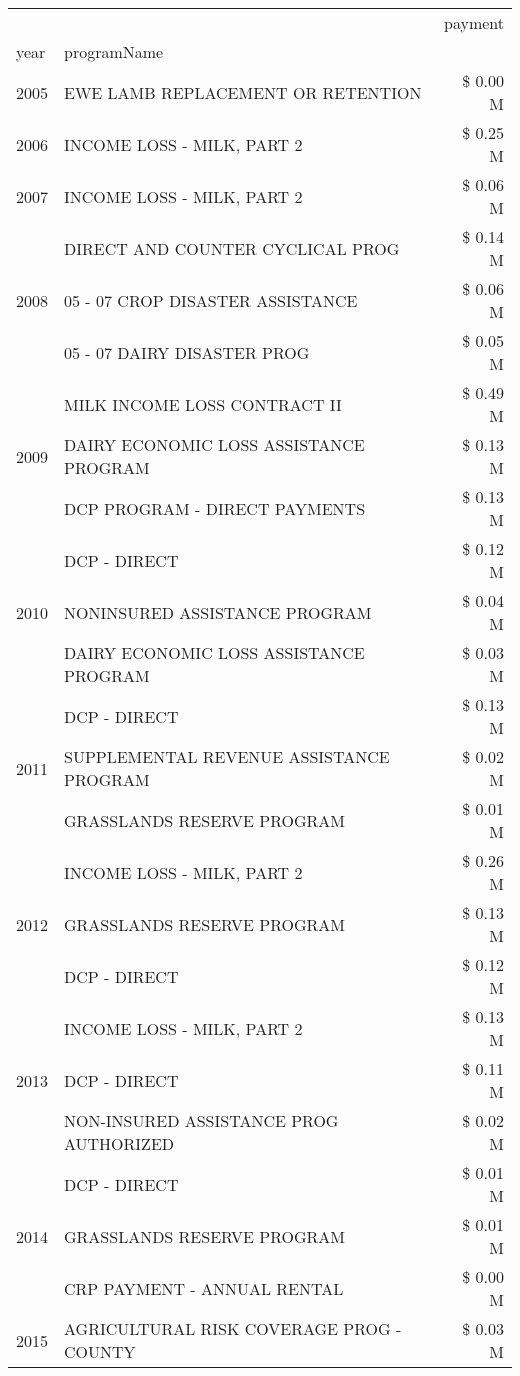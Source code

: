 \begin{tabular}{llr}
\toprule
 &  & payment \\
year & programName &  \\
\midrule
2005 & EWE LAMB REPLACEMENT OR RETENTION & \$ 0.00 M \\
\cline{1-3}
2006 & INCOME LOSS - MILK, PART 2 & \$ 0.25 M \\
\cline{1-3}
2007 & INCOME LOSS - MILK, PART 2 & \$ 0.06 M \\
\cline{1-3}
\multirow[t]{3}{*}{2008} & DIRECT AND COUNTER CYCLICAL PROG & \$ 0.14 M \\
 & 05 - 07 CROP DISASTER ASSISTANCE & \$ 0.06 M \\
 & 05 - 07 DAIRY DISASTER PROG & \$ 0.05 M \\
\cline{1-3}
\multirow[t]{3}{*}{2009} & MILK INCOME LOSS CONTRACT II & \$ 0.49 M \\
 & DAIRY ECONOMIC LOSS ASSISTANCE PROGRAM & \$ 0.13 M \\
 & DCP PROGRAM - DIRECT PAYMENTS & \$ 0.13 M \\
\cline{1-3}
\multirow[t]{3}{*}{2010} & DCP - DIRECT & \$ 0.12 M \\
 & NONINSURED ASSISTANCE PROGRAM & \$ 0.04 M \\
 & DAIRY ECONOMIC LOSS ASSISTANCE PROGRAM & \$ 0.03 M \\
\cline{1-3}
\multirow[t]{3}{*}{2011} & DCP - DIRECT & \$ 0.13 M \\
 & SUPPLEMENTAL REVENUE ASSISTANCE PROGRAM & \$ 0.02 M \\
 & GRASSLANDS RESERVE PROGRAM & \$ 0.01 M \\
\cline{1-3}
\multirow[t]{3}{*}{2012} & INCOME LOSS - MILK, PART 2 & \$ 0.26 M \\
 & GRASSLANDS RESERVE PROGRAM & \$ 0.13 M \\
 & DCP - DIRECT & \$ 0.12 M \\
\cline{1-3}
\multirow[t]{3}{*}{2013} & INCOME LOSS - MILK, PART 2 & \$ 0.13 M \\
 & DCP - DIRECT & \$ 0.11 M \\
 & NON-INSURED ASSISTANCE PROG AUTHORIZED & \$ 0.02 M \\
\cline{1-3}
\multirow[t]{3}{*}{2014} & DCP - DIRECT & \$ 0.01 M \\
 & GRASSLANDS RESERVE PROGRAM & \$ 0.01 M \\
 & CRP PAYMENT - ANNUAL RENTAL & \$ 0.00 M \\
\cline{1-3}
\multirow[t]{3}{*}{2015} & AGRICULTURAL RISK COVERAGE PROG - COUNTY & \$ 0.03 M \\

\end{tabular}
